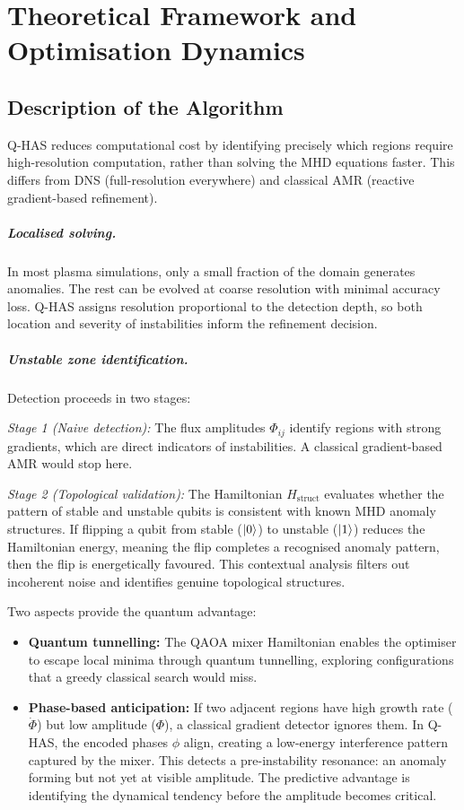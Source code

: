 \documentclass[12pt, a4paper, oneside]{report}
\begin{document}
\chapter{Theoretical Framework and Optimisation Dynamics}
\label{chap:theory}
\section{Description of the Algorithm}

Q-HAS reduces computational cost by identifying precisely which regions require high-resolution computation, rather than solving the MHD equations faster. This differs from DNS (full-resolution everywhere) and classical AMR (reactive gradient-based refinement).

\paragraph{Localised solving.}
In most plasma simulations, only a small fraction of the domain generates anomalies. The rest can be evolved at coarse resolution with minimal accuracy loss. Q-HAS assigns resolution proportional to the detection depth, so both location and severity of instabilities inform the refinement decision.

\paragraph{Unstable zone identification.}
Detection proceeds in two stages:

\noindent \textit{Stage 1 (Naive detection):} The flux amplitudes $\Phi_{ij}$ identify regions with strong gradients, which are direct indicators of instabilities. A classical gradient-based AMR would stop here.

\noindent \textit{Stage 2 (Topological validation):} The Hamiltonian $H_{\text{struct}}$ evaluates whether the pattern of stable and unstable qubits is consistent with known MHD anomaly structures. If flipping a qubit from stable ($\ket{0}$) to unstable ($\ket{1}$) reduces the Hamiltonian energy, meaning the flip completes a recognised anomaly pattern, then the flip is energetically favoured. This contextual analysis filters out incoherent noise and identifies genuine topological structures.

Two aspects provide the quantum advantage:
\begin{itemize}
    \item \textbf{Quantum tunnelling:} The QAOA mixer Hamiltonian enables the optimiser to escape local minima through quantum tunnelling, exploring configurations that a greedy classical search would miss.
    \item \textbf{Phase-based anticipation:} If two adjacent regions have high growth rate ($\dot{\Phi}$) but low amplitude ($\Phi$), a classical gradient detector ignores them. In Q-HAS, the encoded phases $\phi$ align, creating a low-energy interference pattern captured by the mixer. This detects a pre-instability resonance: an anomaly forming but not yet at visible amplitude. The predictive advantage is identifying the dynamical tendency before the amplitude becomes critical.
\end{itemize}
\end{document}
